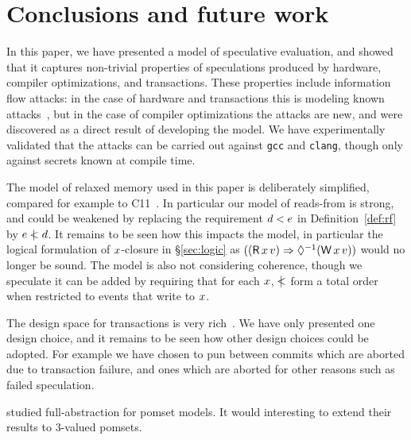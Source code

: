 \section{Conclusions and future work}

In this paper, we have presented a model of speculative evaluation, and
showed that it captures non-trivial properties of speculations produced
by hardware, compiler optimizations, and transactions. These properties
include information flow attacks: in the case of hardware and transactions
this is modeling known attacks~\cite{DBLP:journals/corr/abs-1801-01203,DBLP:conf/uss/DisselkoenKPT17},
but in the case of compiler optimizations the attacks are new, and were
discovered as a direct result of developing the model. We have experimentally
validated that the attacks can be carried out against \verb|gcc| and \verb|clang|,
though only against secrets known at compile time.

The model of relaxed memory used in this paper is deliberately
simplified, compared for example to
C11~\cite{Boehm:2008:FCC:1375581.1375591,Batty:2011:MCC:1926385.1926394}.
In particular our model of reads-from is strong, and could be weakened
by replacing the requirement $d<e$ in Definition~\ref{def:rf}
by $e\mathrel{\,\mid\!\!\!<}d$. It remains to be seen how this impacts the model,
in particular the logical formulation of $x$-closure in
\S\ref{sec:logic} as
$((\DR{\aLoc}{\aVal}) \Rightarrow \once(\DW{\aLoc}{\aVal}))$
would no longer be sound.
The model is also not considering coherence, though we speculate it
can be added by requiring that for each $x$, $\mathrel{\,\mid\!\!\!<}$ form a total
order when restricted to events that write to $x$.

The design space for transactions is very rich~\cite{DBLP:journals/pacmpl/DongolJR18}.
We have only presented one design choice, and it remains to be seen how other
design choices could be adopted. For example we have chosen to pun between
commits which are aborted due to transaction failure, and ones which are aborted
for other reasons such as failed speculation.

\citet{Plotkin:1997:TSP:266557.266600} studied full-abstraction for pomset
models.  It would interesting to extend their results to 3-valued pomsets.

